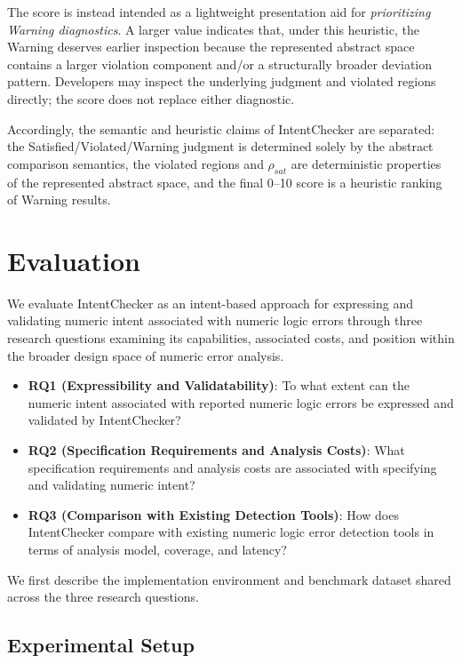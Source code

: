 \documentclass[pdflatex,sn-basic]{sn-jnl}%
\theoremstyle{thmstyleone}%
\theoremstyle{thmstyletwo}%
\theoremstyle{thmstylethree}%
\begin{document}
The score is instead intended as a lightweight presentation aid for
\emph{prioritizing Warning diagnostics}.
A larger value indicates that, under this heuristic, the Warning deserves
earlier inspection because the represented abstract space contains a larger
violation component and/or a structurally broader deviation pattern.
Developers may inspect the underlying judgment and violated regions directly;
the score does not replace either diagnostic.

Accordingly, the semantic and heuristic claims of IntentChecker are separated:
the Satisfied/Violated/Warning judgment is determined solely by the abstract
comparison semantics, the violated regions and
$\rho_{\mathit{sat}}$ are deterministic properties of the represented abstract
space, and the final 0--10 score is a heuristic ranking of Warning results.
\section{Evaluation}\label{sec:evaluation}

We evaluate IntentChecker as an intent-based approach for expressing and validating numeric intent associated with numeric logic errors through three research questions examining its capabilities, associated costs, and position within the broader design space of numeric error analysis.

\begin{itemize}
    \item \textbf{RQ1 (Expressibility and Validatability)}:
    To what extent can the numeric intent associated with reported numeric logic errors be expressed and validated by IntentChecker?

    \item \textbf{RQ2 (Specification Requirements and Analysis Costs)}:
    What specification requirements and analysis costs are associated with specifying and validating numeric intent?

    \item \textbf{RQ3 (Comparison with Existing Detection Tools)}:
    How does IntentChecker compare with existing numeric logic error detection tools in terms of analysis model, coverage, and latency?
\end{itemize}

We first describe the implementation environment and benchmark dataset shared across the three research questions.

\subsection{Experimental Setup}\label{sec:setup}
\end{document}
